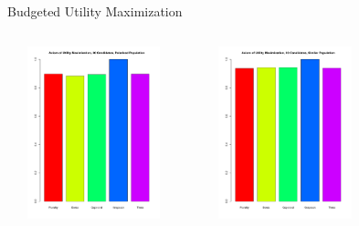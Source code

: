 \documentclass{beamer}
\begin{document}
\begin{frame}{Budgeted Utility Maximization}
	\begin{columns}
             \centering
             \includegraphics[height=5cm, width=5cm]{Presentation_Plots/Axiom_of_Utility_Maximization_20_Candidates_Polarized_Population.pdf}

	 \centering
             \includegraphics[height=5cm, width=5cm]{Presentation_Plots/Axiom_of_Utility_Maximization_20_Candidates_Similar_Population.pdf}
         \end{columns} 
\end{frame}
\end{document}

